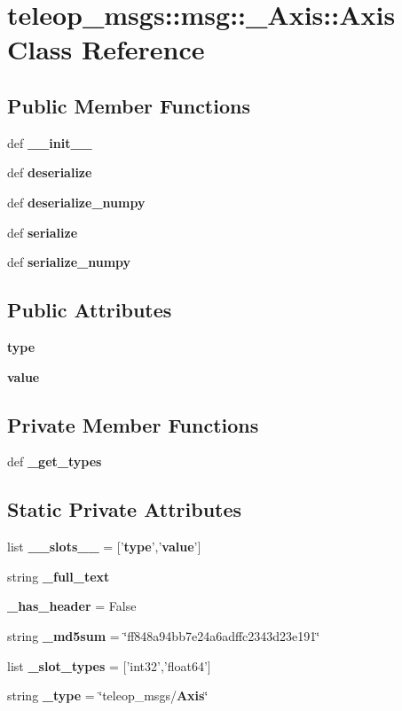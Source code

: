 \section{teleop\_\-msgs::msg::\_\-Axis::Axis Class Reference}
\label{classteleop__msgs_1_1msg_1_1__Axis_1_1Axis}
\subsection*{Public Member Functions}
\begin{DoxyCompactItemize}
\item 
def {\bf \_\-\_\-init\_\-\_\-}
\item 
def {\bf deserialize}
\item 
def {\bf deserialize\_\-numpy}
\item 
def {\bf serialize}
\item 
def {\bf serialize\_\-numpy}
\end{DoxyCompactItemize}
\subsection*{Public Attributes}
\begin{DoxyCompactItemize}
\item 
{\bf type}
\item 
{\bf value}
\end{DoxyCompactItemize}
\subsection*{Private Member Functions}
\begin{DoxyCompactItemize}
\item 
def {\bf \_\-get\_\-types}
\end{DoxyCompactItemize}
\subsection*{Static Private Attributes}
\begin{DoxyCompactItemize}
\item 
list {\bf \_\-\_\-slots\_\-\_\-} = ['{\bf type}','{\bf value}']
\item 
string {\bf \_\-full\_\-text}
\item 
{\bf \_\-has\_\-header} = False
\item 
string {\bf \_\-md5sum} = \char`\"{}ff848a94bb7e24a6adffc2343d23e191\char`\"{}
\item 
list {\bf \_\-slot\_\-types} = ['int32','float64']
\item 
string {\bf \_\-type} = \char`\"{}teleop\_\-msgs/{\bf Axis}\char`\"{}
\end{DoxyCompactItemize}


